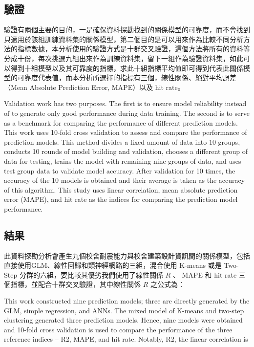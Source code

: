 \subsection{驗證}

驗證有兩個主要的目的，一是確保資料探勘找到的關係模型的可靠度，而不會找到只適用於該組訓練資料集的關係模型，第二個目的是可以用來作為比較不同分析方法的指標數據，本分析使用的驗證方式是十群交叉驗證，這個方法將所有的資料等分成十份，每次挑選九組出來作為訓練資料集，留下一組作為驗證資料集，如此可以得到十組模型以及其可靠度的指標，求此十組指標平均值即可得到代表此關係模型的可靠度代表值，而本分析所選擇的指標有三個，線性關係、絕對平均誤差（Mean Absolute Prediction Error, MAPE）以及 hit rate。

Validation work has two purposes. The first is to ensure model reliability instead of to generate only good performance during data training. The second is to serve as a benchmark for comparing the performance of different prediction models. This work uses 10-fold cross validation to assess and compare the performance of prediction models. This method divides a fixed amount of data into 10 groups, conducts 10 rounds of model building and validation, chooses a different group of data for testing, trains the model with remaining nine groups of data, and uses test group data to validate model accuracy. After validation for 10 times, the accuracy of the 10 models is obtained and their average is taken as the accuracy of this algorithm. This study uses linear correlation, mean absolute prediction error (MAPE), and hit rate as the indices for comparing the prediction model performance.

\subsection{結果}

此資料探勘分析會產生九個校舍耐震能力與校舍建築設計資訊間的關係模型，包括直接使用GLM、線性回歸和類神經網路的三組，混合使用 K-means 或是 Two-Step 分群的六組，要比較其優劣我們使用了線性關係 $R$ 、 MAPE 和 hit rate 三個指標，並配合十群交叉驗證，其中線性關係 $R$ 之公式為：

This work constructed nine prediction models; three are directly generated by the GLM, simple regression, and ANNs. The mixed model of K-means and two-step clustering generated three prediction models. Hence, nine models were obtained and 10-fold cross validation is used to compare the performance of the three reference indices – R2, MAPE, and hit rate. Notably, R2, the linear correlation is

